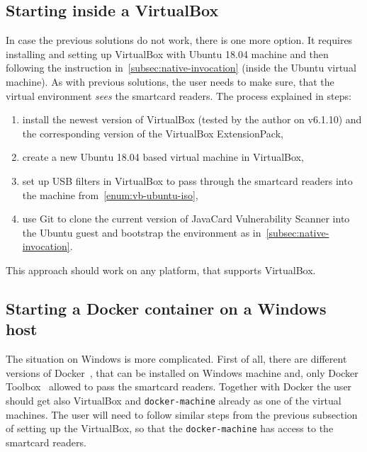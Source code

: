         \subsection{Starting \javus inside a VirtualBox}\label{subsec:vb-invocation}
        In case the previous solutions do not work, there is one more option. It requires installing and setting up VirtualBox with Ubuntu 18.04 machine and then following the instruction in~\ref{subsec:native-invocation} (inside the Ubuntu virtual machine). As with previous solutions, the user needs to make sure, that the virtual environment \textit{sees} the smartcard readers. The process explained in steps:

        \begin{enumerate}
            \item install the newest version of VirtualBox (tested by the author on v6.1.10) and the corresponding version of the VirtualBox ExtensionPack,
            \item\label{enum:vb-ubuntu-iso} create a new Ubuntu 18.04 based virtual machine in VirtualBox,
            \item set up USB filters in VirtualBox to pass through the smartcard readers into the machine from~\ref{enum:vb-ubuntu-iso},
            \item use Git to clone the current version of JavaCard Vulnerability Scanner into the Ubuntu guest and bootstrap the environment as in~\ref{subsec:native-invocation}.
        \end{enumerate}

        This approach should work on any platform, that supports VirtualBox.

        \subsection{Starting a Docker container on a Windows host}
        The situation on Windows is more complicated. First of all, there are different versions of Docker~\cite{dockertoolbox, dockerforwindows}, that can be installed on Windows machine and, only Docker Toolbox~\cite{dockertoolbox} allowed to pass the smartcard readers. Together with Docker the user should get also VirtualBox and \texttt{docker-machine} already as one of the virtual machines. The user will need to follow similar steps from the previous subsection \label{subsec:vb-invocation} of setting up the VirtualBox, so that the \texttt{docker-machine} has access to the smartcard readers.


